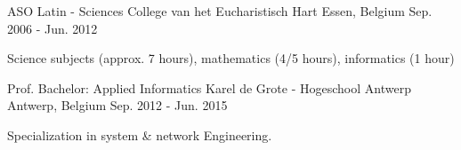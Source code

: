 

\begin{cventries}

  \cventry
    {ASO Latin - Sciences} %
    {College van het Eucharistisch Hart} %
    {Essen, Belgium} %
    {Sep. 2006 - Jun. 2012} %
    {
      \begin{cvitems} %
        \item {Science subjects (approx. 7 hours), mathematics (4/5 hours), informatics (1 hour)}
      \end{cvitems}
    }

  \cventry
    {Prof. Bachelor: Applied Informatics} %
    {Karel de Grote - Hogeschool Antwerp} %
    {Antwerp, Belgium} %
    {Sep. 2012 - Jun. 2015} %
    {
      \begin{cvitems} %
        \item {Specialization in system \& network Engineering.}
      \end{cvitems}
    }

\end{cventries}
